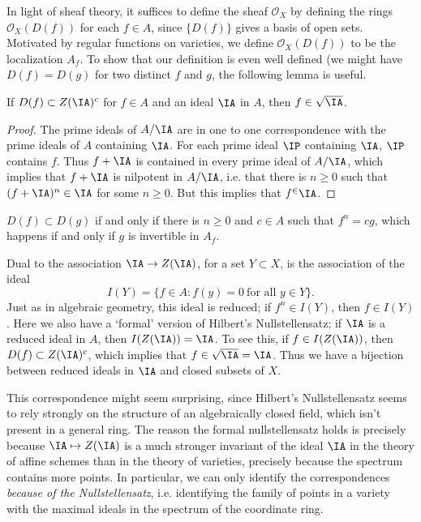 In light of sheaf theory, it suffices to define the sheaf $\mathcal{O}_X$ by defining the rings $\mathcal{O}_X(D(f))$ for each $f \in A$, since $\{ D(f) \}$ gives a basis of open sets. Motivated by regular functions on varieties, we define $\mathcal{O}_X(D(f))$ to be the localization $A_f$. To show that our definition is even well defined (we might have $D(f) = D(g)$ for two distinct $f$ and $g$, the following lemma is useful.

\begin{lemma}
    If $D(f) \subset Z(\IA)^c$ for $f \in A$ and an ideal $\IA$ in $A$, then $f \in \sqrt{\IA}$.
\end{lemma}
\begin{proof}
    The prime ideals of $A/\IA$ are in one to one correspondence with the prime ideals of $A$ containing $\IA$. For each prime ideal $\IP$ containing $\IA$, $\IP$ contains $f$. Thus $f + \IA$ is contained in every prime ideal of $A/\IA$, which implies that $f + \IA$ is nilpotent in $A/\IA$, i.e. that there is $n \geq 0$ such that $(f + \IA)^n \in \IA$ for some $n \geq 0$. But this implies that $f^ \in \IA$.
\end{proof}

\begin{corollary}
    $D(f) \subset D(g)$ if and only if there is $n \geq 0$ and $c \in A$ such that $f^n = cg$, which happens if and only if $g$ is invertible in $A_f$.
\end{corollary}

\begin{remark}
    Dual to the association $\IA \to Z(\IA)$, for a set $Y \subset X$, is the association of the ideal
    \[ I(Y) = \{ f \in A: f(y) = 0\ \text{for all $y \in Y$} \}. \]
    Just as in algebraic geometry, this ideal is reduced; if $f^n \in I(Y)$, then $f \in I(Y)$. Here we also have a `formal' version of Hilbert's Nullstellensatz; if $\IA$ is a reduced ideal in $A$, then $I(Z(\IA)) = \IA$. To see this, if $f \in I(Z(\IA))$, then $D(f) \subset Z(\IA)^c$, which implies that $f \in \sqrt{\IA} = \IA$. Thus we have a bijection between reduced ideals in $\IA$ and closed subsets of $X$.

    This correspondence might seem surprising, since Hilbert's Nullstellensatz seems to rely strongly on the structure of an algebraically closed field, which isn't present in a general ring. The reason the formal nullstellensatz holds is precisely because $\IA \mapsto Z(\IA)$ is a much stronger invariant of the ideal $\IA$ in the theory of affine schemes than in the theory of varieties, precisely because the spectrum contains more points. In particular, we can only identify the correspondences \emph{because of the Nullstellensatz}, i.e. identifying the family of points in a variety with the maximal ideals in the spectrum of the coordinate ring.
\end{remark}

